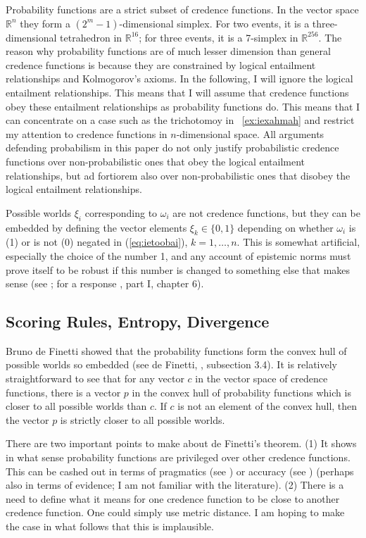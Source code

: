 \documentclass[12pt]{article}
\begin{document}
Probability functions are a strict subset of credence functions. In
the vector space $\mathbb{R}^{n}$ they form a $(2^{m}-1)$-dimensional
simplex. For two events, it is a three-dimensional tetrahedron in
$\mathbb{R}^{16}$; for three events, it is a 7-simplex in
$\mathbb{R}^{256}$. The reason why probability functions are of much
lesser dimension than general credence functions is because they are
constrained by logical entailment relationships and Kolmogorov's
axioms. In the following, I will ignore the logical entailment
relationships. This means that I will assume that credence functions
obey these entailment relationships as probability functions do. This
means that I can concentrate on a case such as the trichotomoy in
{\xample}~\ref{ex:iexahmah} and restrict my attention to credence
functions in $n$-dimensional space. All arguments defending
probabilism in this paper do not only justify probabilistic credence
functions over non-probabilistic ones that obey the logical entailment
relationships, but ad fortiorem also over non-probabilistic ones that
disobey the logical entailment relationships.

Possible worlds $\xi_{i}$ corresponding to $\omega_{i}$ are
not credence functions, but they can be embedded by defining the
vector elements $\xi_{k}\in\{0,1\}$ depending on whether $\omega_{i}$
is (1) or is not (0) negated in (\ref{eq:ietoobai}), $k=1,{\ldots},n$.
This is somewhat artificial, especially the choice of the number 1,
and any account of epistemic norms must prove itself to be robust if
this number is changed to something else that makes sense (see
; for a response , part
I, chapter 6).

\subsection{Scoring Rules, Entropy, Divergence}
\label{subsec:weingoov}

Bruno de Finetti showed that the probability functions form the convex
hull of possible worlds so embedded (see de Finetti,
, subsection 3.4). It is relatively
straightforward to see that for any vector $c$ in the vector space of
credence functions, there is a vector $p$ in the convex hull of
probability functions which is closer to all possible worlds than $c$.
If $c$ is not an element of the convex hull, then the vector $p$ is
strictly closer to all possible worlds.

There are two important points to make about de Finetti's theorem. (1)
It shows in what sense probability functions are privileged over other
credence functions. This can be cashed out in terms of pragmatics (see
) or accuracy (see ) (perhaps
also in terms of evidence; I am not familiar with the literature). (2)
There is a need to define what it means for one credence function to
be close to another credence function. One could simply use metric
distance. I am hoping to make the case in what follows that this is
implausible.
\end{document}
